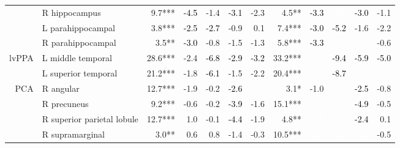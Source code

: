 \documentclass[]{article}
\begin{document}
\begin{table}[ht]
{\begin{tabular}{rlrrrrrrrrrr}
   & R hippocampus & 9.7*** & \cellcolor{green}\textcolor{black}{-4.5} & -1.4 & \cellcolor{green}\textcolor{black}{-3.1} & -2.3 & 4.5** & \cellcolor{green}\textcolor{black}{-3.3} & \cellcolor{red}\textcolor{white}{-3.0} & \cellcolor{green}\textcolor{black}{-3.0} & -1.1 \\ 
   & L parahippocampal & 3.8*** & \cellcolor{green}\textcolor{black}{-2.5} & \cellcolor{green}\textcolor{black}{-2.7} & -0.9 & 0.1 & 7.4*** & \cellcolor{green}\textcolor{black}{-3.0} & \cellcolor{green}\textcolor{black}{-5.2} & -1.6 & -2.2 \\ 
   & R parahippocampal & 3.5** & \cellcolor{green}\textcolor{black}{-3.0} & -0.8 & -1.5 & -1.3 & 5.8*** & \cellcolor{green}\textcolor{black}{-3.3} & \cellcolor{red}\textcolor{white}{-3.5} & \cellcolor{red}\textcolor{white}{-3.7} & -0.6 \\ 
  lvPPA & L middle temporal & 28.6*** & -2.4 & \cellcolor{green}\textcolor{black}{-6.8} & \cellcolor{green}\textcolor{black}{-2.9} & \cellcolor{green}\textcolor{black}{-3.2} & 33.2*** & \cellcolor{red}\textcolor{white}{-8.9} & \cellcolor{green}\textcolor{black}{-9.4} & \cellcolor{green}\textcolor{black}{-5.9} & \cellcolor{green}\textcolor{black}{-5.0} \\ 
   & L superior temporal & 21.2*** & -1.8 & \cellcolor{green}\textcolor{black}{-6.1} & -1.5 & -2.2 & 20.4*** & \cellcolor{red}\textcolor{white}{-4.4} & \cellcolor{green}\textcolor{black}{-8.7} & \cellcolor{red}\textcolor{white}{-4.7} & \cellcolor{red}\textcolor{white}{-3.1} \\ 
  PCA & R angular & 12.7*** & -1.9 & -0.2 & \cellcolor{green}\textcolor{black}{-2.6} & \cellcolor{blue}\textcolor{white}{-2.7} & 3.1* & -1.0 & \cellcolor{red}\textcolor{white}{-3.1} & \cellcolor{green}\textcolor{black}{-2.5} & -0.8 \\ 
   & R precuneus & 9.2*** & -0.6 & -0.2 & \cellcolor{green}\textcolor{black}{-3.9} & -1.6 & 15.1*** & \cellcolor{red}\textcolor{white}{-6.4} & \cellcolor{red}\textcolor{white}{-5.2} & \cellcolor{green}\textcolor{black}{-4.9} & -0.5 \\ 
   & R superior parietal lobule & 12.7*** & 1.0 & -0.1 & \cellcolor{green}\textcolor{black}{-4.4} & -1.9 & 4.8** & \cellcolor{red}\textcolor{white}{-3.8} & \cellcolor{red}\textcolor{white}{-2.6} & \cellcolor{green}\textcolor{black}{-2.4} & 0.1 \\ 
   & R supramarginal & 3.0** & 0.6 & 0.8 & -1.4 & -0.3 & 10.5*** & \cellcolor{red}\textcolor{white}{-6.2} & \cellcolor{red}\textcolor{white}{-3.2} & \cellcolor{red}\textcolor{white}{-3.1} & -0.5 \\ 

\end{tabular}}
\end{table}
\end{document}
